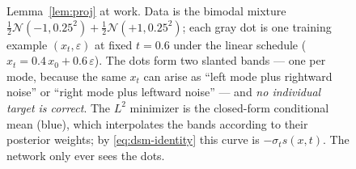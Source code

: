 \documentclass[10pt,a4paper]{article}
\newcommand{\E}{\mathbb{E}}
\newcommand{\score}{s}
\newcommand{\veps}{\varepsilon}
\begin{document}
\begin{figure}[t]
\centering
{}
\caption{Lemma~\ref{lem:proj} at work. Data is the bimodal mixture
$\tfrac12\mathcal{N}(-1, 0.25^2) + \tfrac12\mathcal{N}(+1, 0.25^2)$;
each gray dot is one training example $(x_t, \veps)$ at fixed
$t = 0.6$ under the linear schedule ($x_t = 0.4\,x_0 + 0.6\,\veps$). The
dots form two slanted bands --- one per mode, because the same $x_t$ can
arise as ``left mode plus rightward noise'' or ``right mode plus leftward
noise'' --- and \emph{no individual target is correct}. The $L^2$ minimizer
is the closed-form conditional mean (blue), which interpolates the bands
according to their posterior weights; by \eqref{eq:dsm-identity} this curve
is $-\sigma_t \score(x, t)$. The network only ever sees the dots.}
\label{fig:lemma}
\end{figure}
\end{document}

